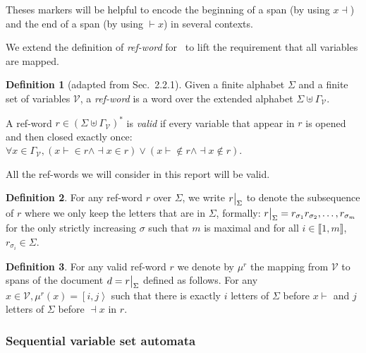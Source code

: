 \documentclass[11px]{article}
\theoremstyle{definition}
\newtheorem{definition}{Definition}
\newcommand{\Span}[1]{\left[ #1 \right\rangle}
\newcommand\restr[2]{{%
  \left.\kern-\nulldelimiterspace %
  #1 %
  \vphantom{\big|} %
  \right|_{#2} %
  }}
\begin{document}
        Theses markers will be helpful to encode the beginning of a span (by
        using $x{\dashv}$) and the end of a span (by using ${\vdash}x$) in
        several contexts.

        We extend the definition of \emph{ref-word} for~\cite{peterfreund} to
        lift the requirement that all variables are mapped.

        \begin{definition}[adapted from \cite{peterfreund} Sec.\ 2.2.1]
          Given a finite alphabet $\Sigma$ and a finite set of variables
          $\mathcal{V}$, a \textit{ref-word} is a word over the extended
          alphabet $\Sigma \uplus \Gamma_\mathcal{V}$.

          A ref-word $r \in {(\Sigma \uplus \Gamma_\mathcal{V})}^*$ is
          \textit{valid} if every variable that appear in $r$ is opened and
          then closed exactly once: $\forall x \in \Gamma_\mathcal{V},
          (x{\vdash} \in r \land {\dashv}x \in r) \lor (x{\vdash} \notin r
          \land {\dashv}x \notin r)$.
        \end{definition}

        All the ref-words we will consider in this report will be valid.

        \begin{definition}
          For any ref-word $r$ over $\Sigma$, we write $\restr{r}{\Sigma}$ to
          denote the subsequence of $r$ where we only keep the letters that are
          in $\Sigma$, formally: $\restr{r}{\Sigma} = r_{\sigma_1}
          r_{\sigma_2}, \ldots, r_{\sigma_m}$ for the only strictly increasing
          $\sigma$ such that $m$ is maximal and for all $i \in \llbracket 1, m
          \rrbracket$, $r_{\sigma_i} \in \Sigma$.
        \end{definition}

        \begin{definition}
          For any valid ref-word $r$ we denote by $\mu^r$ the mapping from
          $\mathcal{V}$ to spans of the document $d = \restr{r}{\Sigma}$
          defined as follows. For any $x \in \mathcal{V}, \mu^r (x) = \Span{i,
          j}$ such that there is exactly $i$ letters of $\Sigma$ before
          $x{\vdash}$ and $j$ letters of $\Sigma$ before ${\dashv}x$ in $r$.
        \end{definition}

      \subsubsection{Sequential variable set automata}
\end{document}
